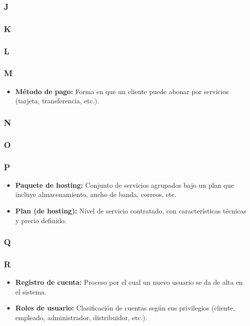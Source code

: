 \subsubsection*{J}

\subsubsection*{K}

\subsubsection*{L}

\subsubsection*{M}
\begin{itemize}
    \item \textbf {Método de pago:} Forma en que un cliente puede abonar por servicios (tarjeta, transferencia, etc.).
\end{itemize}

\subsubsection*{N}

\subsubsection*{O}

\subsubsection*{P}
\begin{itemize}
    \item \textbf{Paquete de hosting:} Conjunto de servicios agrupados bajo un plan que incluye almacenamiento, ancho de banda, correos, etc.
    \item \textbf{Plan (de hosting):} Nivel de servicio contratado, con características técnicas y precio definido.
\end{itemize}

\subsubsection*{Q}

\subsubsection*{R}
\begin{itemize}
    \item \textbf{Registro de cuenta:} Proceso por el cual un nuevo usuario se da de alta en el sistema.
    \item \textbf{Roles de usuario:} Clasificación de cuentas según sus privilegios (cliente, empleado, administrador, distribuidor, etc.).
\end{itemize}

